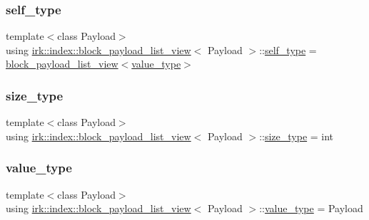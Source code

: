 \subsubsection{\texorpdfstring{self\+\_\+type}{self\_type}}
{\footnotesize\ttfamily template$<$class Payload$>$ \\
using \mbox{\hyperlink{classirk_1_1index_1_1block__payload__list__view}{irk\+::index\+::block\+\_\+payload\+\_\+list\+\_\+view}}$<$ Payload $>$\+::\mbox{\hyperlink{classirk_1_1index_1_1block__payload__list__view_a29e1995bbc64a8512bacf6c110f24f9e}{self\+\_\+type}} =  \mbox{\hyperlink{classirk_1_1index_1_1block__payload__list__view}{block\+\_\+payload\+\_\+list\+\_\+view}}$<$\mbox{\hyperlink{classirk_1_1index_1_1block__payload__list__view_a739d436330ba54972ef70a5cd3f57ef3}{value\+\_\+type}}$>$}

\mbox{\label{classirk_1_1index_1_1block__payload__list__view_aa7545a3c9095406fb90e0dca7b146b60}} 
\subsubsection{\texorpdfstring{size\+\_\+type}{size\_type}}
{\footnotesize\ttfamily template$<$class Payload$>$ \\
using \mbox{\hyperlink{classirk_1_1index_1_1block__payload__list__view}{irk\+::index\+::block\+\_\+payload\+\_\+list\+\_\+view}}$<$ Payload $>$\+::\mbox{\hyperlink{classirk_1_1index_1_1block__payload__list__view_aa7545a3c9095406fb90e0dca7b146b60}{size\+\_\+type}} =  int}

\mbox{\label{classirk_1_1index_1_1block__payload__list__view_a739d436330ba54972ef70a5cd3f57ef3}} 
\subsubsection{\texorpdfstring{value\+\_\+type}{value\_type}}
{\footnotesize\ttfamily template$<$class Payload$>$ \\
using \mbox{\hyperlink{classirk_1_1index_1_1block__payload__list__view}{irk\+::index\+::block\+\_\+payload\+\_\+list\+\_\+view}}$<$ Payload $>$\+::\mbox{\hyperlink{classirk_1_1index_1_1block__payload__list__view_a739d436330ba54972ef70a5cd3f57ef3}{value\+\_\+type}} =  Payload}



